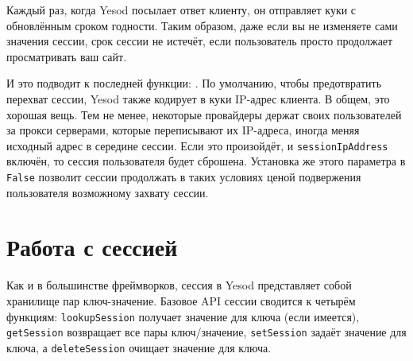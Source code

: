\begin{remark}
Каждый раз, когда Yesod посылает ответ клиенту, он отправляет куки с обновлённым сроком годности. Таким образом, даже если вы не изменяете сами значения сессии, срок сессии не истечёт, если пользователь просто продолжает просматривать ваш сайт.
\end{remark}

И это подводит к последней функции: . По умолчанию, чтобы предотвратить перехват сессии, Yesod также кодирует в куки IP-адрес клиента. В общем, это хорошая вещь. Тем не менее, некоторые провайдеры держат своих пользователей за прокси серверами, которые переписывают их IP-адреса, иногда меняя исходный адрес в середине сессии. Если это произойдёт, и \lstinline'sessionIpAddress' включён, то сессия пользователя будет сброшена. Установка же этого параметра в \lstinline'False' позволит сессии продолжать в таких условиях ценой подвержения пользователя возможному захвату сессии.

\section{Работа с сессией}

Как и в большинстве фреймворков, сессия в Yesod представляет собой хранилище пар ключ-значение. Базовое API сессии сводится к четырём функциям: \lstinline'lookupSession' получает значение для ключа (если имеется), \lstinline'getSession' возвращает все пары ключ/значение, \lstinline'setSession' задаёт значение для ключа, а \lstinline'deleteSession' очищает значение для ключа.


